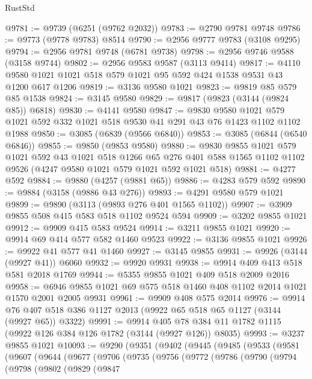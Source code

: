 \begin{lexlean}{RustStd}
\begin{coremodule}
{\begin{coremodule}
{{{{{{{{{{{{{{{{{{{{{{{{{{@9781 := @9739 (@6251 (@9762 @2032))
@9783 := @2790 @9781 @9748
@9786 := @9773 (@9778 @9783) @8514
@9790 := @2956 @9777 @9783 (@3108 @9295)
@9794 := @2956 @9781 @9748 (@6781 @9738)
@9798 := @2956 @9746 @9588 (@3158 @9744)
@9802 := @2956 @9583 @9587 (@3113 @9414)
@9817 := @4110 @9580 @1021 @1021 @518 @579 @1021 @95 @592 @424 @1538 @9531 @43 @1200 @617 @1206
@9819 := @3136 @9580 @1021
@9823 := @9819 @85 @579 @85 @1538
@9824 := @3145 @9580
@9829 := @9817 (@9823 (@3144 (@9824 @85)) @6818)
@9830 := @4141 @9580
@9847 := @9830
    @9580
    @1021
    @579
    @1021
    @592
    @332
    @1021
    @518
    @9530
    @41
    @291
    @43
    @76
    @1423
    @1102
    @1102
    @1988
@9850 := @3085 (@6839 (@9566 @6840))
@9853 := @3085 (@6844 (@6540 @6846))
@9855 := @9850 (@9853 @9580)
@9880 := @9830
    @9855
    @1021
    @579
    @1021
    @592
    @43
    @1021
    @518
    @1266
    @65
    @276
    @401
    @588
    @1565
    @1102
    @1102
    @9526
    (@4247 @9580 @1021 @579 @1021 @592 @1021 @518)
@9881 := @4277 @592
@9884 := @9880 (@4257 (@9881 @65))
@9886 := @4283 @579 @592
@9890 := @9884 (@3158 (@9886 @43 @276))
@9893 := @4291 @9580 @579 @1021
@9899 := @9890 (@3113 (@9893 @276 @401 @1565 @1102))
@9907 := @3909 @9855 @508 @415 @583 @518 @1102 @9524 @594
@9909 := @3202 @9855 @1021
@9912 := @9909 @415 @583 @9524
@9914 := @3211 @9855 @1021
@9920 := @9914 @69 @414 @577 @582 @1460 @9523
@9922 := @3136 @9855 @1021
@9926 := @9922 @41 @577 @41 @1460
@9927 := @3145 @9855
@9931 := @9926 (@3144 (@9927 @41)) @6060
@9932 := @9920 @9931
@9938 := @9914 @409 @413 @518 @581 @2018 @1769
@9944 := @5355 @9855 @1021 @409 @518 @2009 @2016
@9958 := @6946 @9855 @1021 @69 @575 @518 @1460 @408 @1102 @2014 @1021 @1570 @2001 @2005 @9931
@9961 := @9909 @408 @575 @2014
@9976 := @9914 @76 @407 @518 @386 @1127 @2013 (@9922 @65 @518 @65 @1127 (@3144 (@9927 @65)) @3322)
@9991 := @9914 @405 @78 @384 @11 @1782 @1115 (@9922 @126 @384 @126 @1782 (@3144 (@9927 @126)) @8035)
@9993 := @3237 @9855 @1021
@10093 := @9290
    (@9351
      (@9402
        (@9445
          (@9485
            (@9533
              (@9581
                (@9607
                  (@9644
                    (@9677
                      (@9706
                        (@9735
                          (@9756
                            (@9772
                              (@9786
                                (@9790
                                  (@9794
                                    (@9798
                                      (@9802
                                        (@9829
                                          (@9847
}}}}}}}}}}}}}}}}}}}}}}}}}}
\end{coremodule}}
\end{coremodule}
\end{lexlean}
